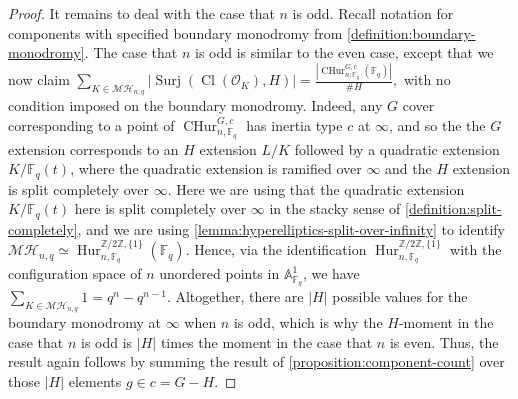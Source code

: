 \documentclass[12 pt]{amsart}
\theoremstyle{plain}
\theoremstyle{definition}
\newtheorem{remark}[theorem]{Remark}
\theoremstyle{remark}
\numberwithin{equation}{section}
\DeclareMathOperator\cl{Cl}
\newcommand{\phur}[4]{\operatorname{Hur}^{#1, #3}_{#2,#4}}
\newcommand{\cphur}[4]{\operatorname{CHur}^{#1, #3}_{#2, #4}}
\DeclareMathOperator\surj{Surj}
\begin{document}
\begin{proof}
It remains to deal with the case that $n$ is odd.
Recall notation for components with specified boundary monodromy from
\autoref{definition:boundary-monodromy}.
The case that $n$ is odd is similar to the even case, except that
we 
now claim
$\sum_{K \in \mathcal{MH}_{n,q}} \left|\surj(\cl(\mathscr O_K), H) \right|=
\frac{ \left|\cphur G n c {\mathbb F_q} (\mathbb F_q) \right|}{\# H},$
with no condition imposed on the boundary monodromy.
Indeed, any $G$
cover corresponding to a point of
$\cphur G n c {\mathbb F_q}$ has inertia type $c$ at $\infty$, and so the the $G$
extension corresponds to an $H$ extension $L/K$ followed by a quadratic
extension $K/\mathbb F_q(t)$, where the quadratic extension is ramified over $\infty$
and the $H$ extension is split completely over $\infty$.
Here we are using that the quadratic extension $K/\mathbb F_q(t)$ here is split
completely over
$\infty$ in the stacky sense of \autoref{definition:split-completely}, and we
are using \autoref{lemma:hyperelliptics-split-over-infinity} to identify 
$\mathcal {MH}_{n,q} \simeq \phur {\mathbb Z/2 \mathbb Z} n {\{1\}} {\mathbb
F_q} (\mathbb F_q)$.
Hence, via the identification 
$\phur {\mathbb Z/2 \mathbb Z} n {\{1\}} {\mathbb
F_q}$ with the configuration space of $n$ unordered points in $\mathbb
A^1_{\mathbb F_q}$, we have
$\sum_{K \in \mathcal{MH}_{n,q}} 1 = q^n - q^{n-1}$.
Altogether, there are $|H|$ possible values for the boundary
monodromy at $\infty$ when $n$ is odd, which is why the $H$-moment in
the case that $n$ is odd is $|H|$ times the moment in the case that $n$
is even. Thus, the result
again follows by summing the result of
\autoref{proposition:component-count} over those $|H|$ elements $g
\in c = G - H$.
\end{proof}
\end{document}
